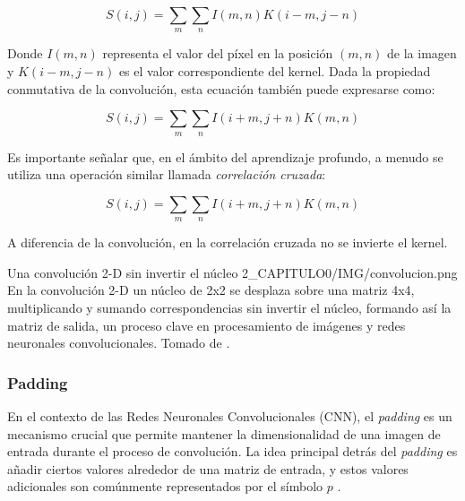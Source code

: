                 \begin{equation}
                S(i,j) = \sum_m \sum_n I(m,n)K(i-m,j-n)
                \end{equation}
                
                Donde $I(m,n)$ representa el valor del píxel en la posición $(m,n)$ de la imagen y $K(i-m,j-n)$ es el valor correspondiente del kernel. Dada la propiedad conmutativa de la convolución, esta ecuación también puede expresarse como:
                
                \begin{equation}
                S(i,j) = \sum_m \sum_n I(i+m,j+n)K(m,n)
                \end{equation}
                
                Es importante señalar que, en el ámbito del aprendizaje profundo, a menudo se utiliza una operación similar llamada \textit{correlación cruzada}:
                
                \begin{equation}
                S(i,j) = \sum_m \sum_n I(i+m,j+n)K(m,n)
                \end{equation}
                
                A diferencia de la convolución, en la correlación cruzada no se invierte el kernel.

                \insertfigure
                    {Una convolución 2-D sin invertir el núcleo}
                    {2_CAPITULO0/IMG/convolucion.png}
                    {En la convolución 2-D un núcleo de 2x2 se desplaza sobre una matriz 4x4, multiplicando y sumando correspondencias sin invertir el núcleo, formando así la matriz de salida, un proceso clave en procesamiento de imágenes y redes neuronales convolucionales. Tomado de \textcite{USGS2023}.} 
            

            \subsubsection{Padding}
                En el contexto de las Redes Neuronales Convolucionales (CNN), el \textit{padding} es un mecanismo crucial que permite mantener la dimensionalidad de una imagen de entrada durante el proceso de convolución. La idea principal detrás del \textit{padding} es añadir ciertos valores alrededor de una matriz de entrada, y estos valores adicionales son comúnmente representados por el símbolo \( p \) \autocite{Goodfellow2016}.

